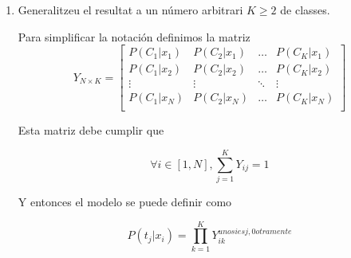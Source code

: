 \documentclass[a4paper]{article}
\begin{document}
\begin{enumerate}
{  Este resultado es lógico: la opción más verosímil es la que ya se ha observado.



  }

  \item Generalitzeu el resultat a un número arbitrari $K \geq 2$ de classes.

  {\bfseries

  Para simplificar la notación definimos la matriz
  \begin{equation*}
    Y_{N \times K} =
    \begin{bmatrix}
      P(C_1 | x_1) & P(C_2 | x_1) & \dots & P(C_K | x_1) \\
      P(C_1 | x_2) & P(C_2 | x_2) & \dots & P(C_K | x_2) \\
      \vdots       & \vdots       & \ddots& \vdots       \\
      P(C_1 | x_N) & P(C_2 | x_N) & \dots & P(C_K | x_N) \\
    \end{bmatrix}
  \end{equation*}

  Esta matriz debe cumplir que

  \begin{equation*}
    \forall i \in [1,N],  \sum_{j = 1}^{K} Y_{ij} = 1
  \end{equation*}

  Y entonces el modelo se puede definir como

  \begin{equation*}
    P(t_j | x_i) = \prod_{k = 1}^{K} Y_{ik}^{uno si es j, 0 otramente}
  \end{equation*}





  }
\end{enumerate}
\end{document}
